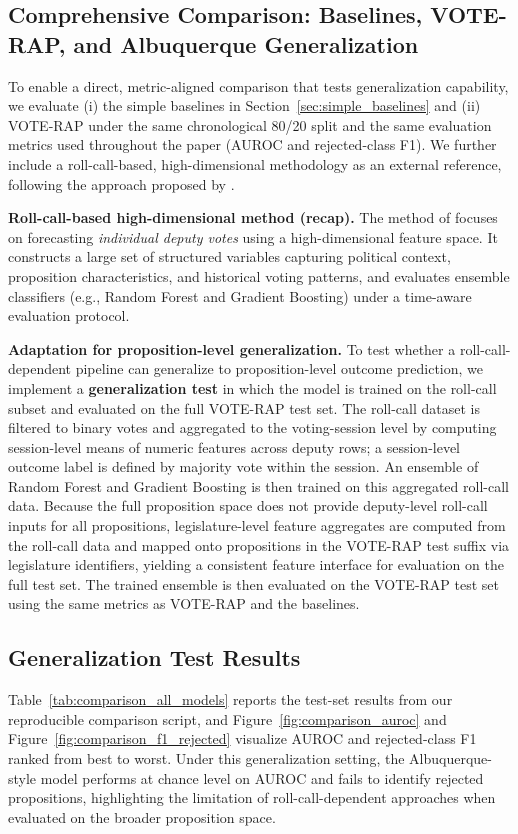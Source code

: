 \documentclass[review]{elsarticle}
\begin{document}
\subsection{Comprehensive Comparison: Baselines, VOTE-RAP, and Albuquerque Generalization}
\label{sec:comparison_albuquerque}
To enable a direct, metric-aligned comparison that tests generalization capability, we evaluate (i) the simple baselines in Section~\ref{sec:simple_baselines} and (ii) VOTE-RAP under the same chronological 80/20 split and the same evaluation metrics used throughout the paper (AUROC and rejected-class F1). We further include a roll-call-based, high-dimensional methodology as an external reference, following the approach proposed by \citet{Albuquerque2025Forecasting}.

\par
\textbf{Roll-call-based high-dimensional method (recap).}
The method of \citet{Albuquerque2025Forecasting} focuses on forecasting \emph{individual deputy votes} using a high-dimensional feature space. It constructs a large set of structured variables capturing political context, proposition characteristics, and historical voting patterns, and evaluates ensemble classifiers (e.g., Random Forest and Gradient Boosting) under a time-aware evaluation protocol.

\par
\textbf{Adaptation for proposition-level generalization.}
To test whether a roll-call-dependent pipeline can generalize to proposition-level outcome prediction, we implement a \textbf{generalization test} in which the model is trained on the roll-call subset and evaluated on the full VOTE-RAP test set. The roll-call dataset is filtered to binary votes and aggregated to the voting-session level by computing session-level means of numeric features across deputy rows; a session-level outcome label is defined by majority vote within the session. An ensemble of Random Forest and Gradient Boosting is then trained on this aggregated roll-call data.
Because the full proposition space does not provide deputy-level roll-call inputs for all propositions, legislature-level feature aggregates are computed from the roll-call data and mapped onto propositions in the VOTE-RAP test suffix via legislature identifiers, yielding a consistent feature interface for evaluation on the full test set. The trained ensemble is then evaluated on the VOTE-RAP test set using the same metrics as VOTE-RAP and the baselines.


\subsection{Generalization Test Results}
\label{sec:comparison_albuquerque_results}
Table~\ref{tab:comparison_all_models} reports the test-set results from our reproducible comparison script, and Figure~\ref{fig:comparison_auroc} and Figure~\ref{fig:comparison_f1_rejected} visualize AUROC and rejected-class F1 ranked from best to worst. Under this generalization setting, the Albuquerque-style model performs at chance level on AUROC and fails to identify rejected propositions, highlighting the limitation of roll-call-dependent approaches when evaluated on the broader proposition space.
\end{document}
